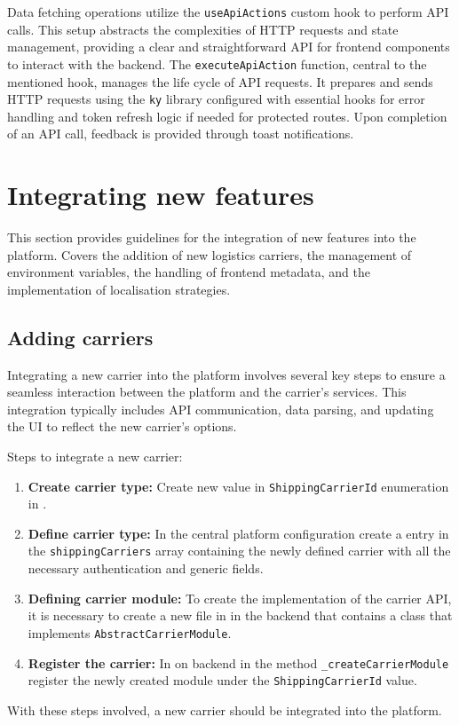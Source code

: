 Data fetching operations utilize the \texttt{useApiActions} custom hook to perform API calls. 
This setup abstracts the complexities of HTTP requests and state management, providing a clear and straightforward API for frontend components to interact with the backend.
The \texttt{executeApiAction} function, central to the mentioned hook, manages the life cycle of API requests. It prepares and sends HTTP requests using the \texttt{ky} library configured with essential hooks for error handling and token refresh logic if needed for protected routes.
Upon completion of an API call, feedback is provided through toast notifications.

\section{Integrating new features}
\label{attachments:programming-platform.integrating}
This section provides guidelines for the integration of new features into the platform. 
Covers the addition of new logistics carriers, the management of environment variables, the handling of frontend metadata, and the implementation of localisation strategies.

\subsection{Adding carriers}
Integrating a new carrier into the platform involves several key steps to ensure a seamless interaction between the platform and the carrier's services. 
This integration typically includes API communication, data parsing, and updating the UI to reflect the new carrier's options.

Steps to integrate a new carrier:
\begin{enumerate}
    \item \textbf{Create carrier type:} Create new value in \texttt{ShippingCarrierId} enumeration in .
    \item \textbf{Define carrier type:} In the central platform configuration  create a entry in the \texttt{shippingCarriers} array containing the newly defined carrier with all the necessary authentication and generic fields.
    \item \textbf{Defining carrier module:} To create the implementation of the carrier API, it is necessary to create a new file in  in the backend that contains a class that implements \texttt{AbstractCarrierModule}.
    \item \textbf{Register the carrier:} In  on backend in the method \texttt{\_createCarrierModule} register the newly created module under the \texttt{ShippingCarrierId} value.
\end{enumerate}
With these steps involved, a new carrier should be integrated into the platform.


